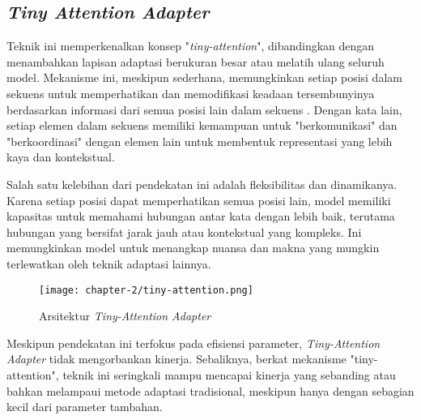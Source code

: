 \subsection{\textit{Tiny Attention Adapter}}

Teknik ini memperkenalkan konsep "\textit{tiny-attention}", dibandingkan dengan menambahkan lapisan adaptasi berukuran besar atau melatih ulang seluruh model. Mekanisme ini, meskipun sederhana, memungkinkan setiap posisi dalam sekuens untuk memperhatikan dan memodifikasi keadaan tersembunyinya berdasarkan informasi dari semua posisi lain dalam sekuens \parencite{tinyattention}. Dengan kata lain, setiap elemen dalam sekuens memiliki kemampuan untuk "berkomunikasi" dan "berkoordinasi" dengan elemen lain untuk membentuk representasi yang lebih kaya dan kontekstual.

Salah satu kelebihan dari pendekatan ini adalah fleksibilitas dan dinamikanya. Karena setiap posisi dapat memperhatikan semua posisi lain, model memiliki kapasitas untuk memahami hubungan antar kata dengan lebih baik, terutama hubungan yang bersifat jarak jauh atau kontekstual yang kompleks. Ini memungkinkan model untuk menangkap nuansa dan makna yang mungkin terlewatkan oleh teknik adaptasi lainnya.

\begin{figure}[ht]
    \centering
    \texttt{[image: chapter-2/tiny-attention.png]}
    \caption{Arsitektur \textit{Tiny-Attention Adapter} \parencite{tinyattention}}
    \label{fig:tiny-attention}
\end{figure}


Meskipun pendekatan ini terfokus pada efisiensi parameter, \textit{Tiny-Attention Adapter} tidak mengorbankan kinerja. Sebaliknya, berkat mekanisme "tiny-attention", teknik ini seringkali mampu mencapai kinerja yang sebanding atau bahkan melampaui metode adaptasi tradisional, meskipun hanya dengan sebagian kecil dari parameter tambahan.